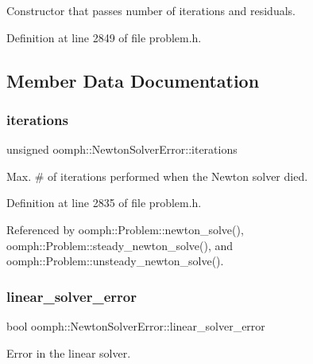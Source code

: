 Constructor that passes number of iterations and residuals. 



Definition at line 2849 of file problem.\+h.



\subsection{Member Data Documentation}
\mbox{\label{classoomph_1_1NewtonSolverError_aaae34aeb5b4128c87e03c89de1de60a8}} 
\subsubsection{\texorpdfstring{iterations}{iterations}}
{\footnotesize\ttfamily unsigned oomph\+::\+Newton\+Solver\+Error\+::iterations}



Max. \# of iterations performed when the Newton solver died. 



Definition at line 2835 of file problem.\+h.



Referenced by oomph\+::\+Problem\+::newton\+\_\+solve(), oomph\+::\+Problem\+::steady\+\_\+newton\+\_\+solve(), and oomph\+::\+Problem\+::unsteady\+\_\+newton\+\_\+solve().

\mbox{\label{classoomph_1_1NewtonSolverError_a30a00b1e2e2baaf733f6197572399875}} 
\subsubsection{\texorpdfstring{linear\+\_\+solver\+\_\+error}{linear\_solver\_error}}
{\footnotesize\ttfamily bool oomph\+::\+Newton\+Solver\+Error\+::linear\+\_\+solver\+\_\+error}



Error in the linear solver. 




